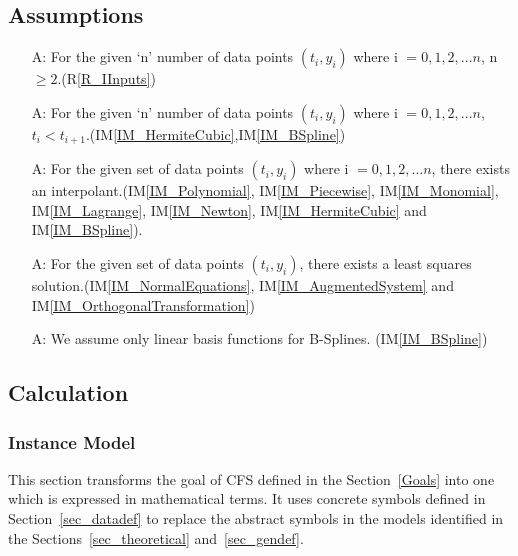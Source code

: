 \documentclass[12pt]{article}
\newcounter{assumpnum} %
\newcommand{\iref}[1]{IM\ref{#1}}
\newcommand{\rref}[1]{R\ref{#1}}
\newcommand{\famname}{CFS} %
\begin{document}
\subsection{Assumptions}

\begin{itemize}

\item[A\refstepcounter{assumpnum}\theassumpnum \label{A_data}:] For the given `n' number of data points $(t_i,y_i)$ where i $= 0,1,2,...n$, n $\geq 2$.(\rref{R_IInputs})
\item[A\refstepcounter{assumpnum}\theassumpnum \label{A_dataConstraint}:] For the given `n' number of data points $(t_i,y_i)$ where i $= 0,1,2,...n$, $t_i < t_{i+1}$.(\iref{IM_HermiteCubic},\iref{IM_BSpline})
\item[A\refstepcounter{assumpnum}\theassumpnum \label{A_Interpolation}:] For the given set of data points $(t_i,y_i)$ where i $= 0,1,2,...n$,  there exists an interpolant.(\iref{IM_Polynomial}, \iref{IM_Piecewise}, \iref{IM_Monomial}, \iref{IM_Lagrange}, \iref{IM_Newton}, \iref{IM_HermiteCubic} and \iref{IM_BSpline}).

\item[A\refstepcounter{assumpnum}\theassumpnum \label{A_Regression}:] For the given set of data points $(t_i,y_i)$, there exists a least squares solution.(\iref{IM_NormalEquations}, \iref{IM_AugmentedSystem} and \iref{IM_OrthogonalTransformation})
\item[A\refstepcounter{assumpnum}\theassumpnum \label{A_BSplines}:] We assume only linear basis functions for B-Splines. (\iref{IM_BSpline}) 


\end{itemize}

\subsection{Calculation} \label{sec_Calculation}



\subsubsection{Instance Model} \label{PolynomialInterpolation}    

This section transforms the goal of \famname{} defined in the Section~\ref{Goals} into one which is expressed in mathematical terms. It uses concrete symbols defined in Section~\ref{sec_datadef} to replace the abstract symbols in the models identified in the Sections~\ref{sec_theoretical} and~\ref{sec_gendef}.
\end{document}

